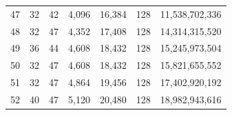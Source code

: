 \begin{table}
\begin{tabular}{l|lllll|r}
47 & 32 & 42 & 4,096 & 16,384 & 128 & 11,538,702,336 \\
48 & 32 & 47 & 4,352 & 17,408 & 128 & 14,314,315,520 \\
49 & 36 & 44 & 4,608 & 18,432 & 128 & 15,245,973,504 \\
50 & 32 & 47 & 4,608 & 18,432 & 128 & 15,821,655,552 \\
51 & 32 & 47 & 4,864 & 19,456 & 128 & 17,402,920,192 \\
52 & 40 & 47 & 5,120 & 20,480 & 128 & 18,982,943,616 \\
\bottomrule
\end{tabular}
\label{tab:scales}
\end{table}